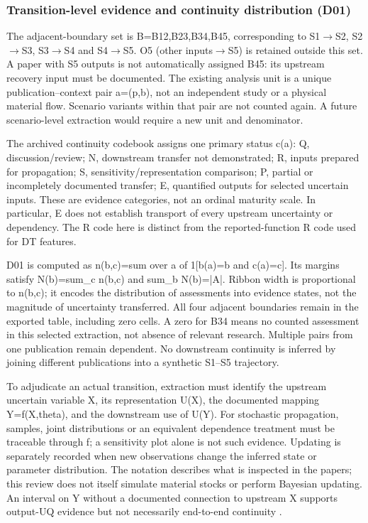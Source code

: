 \subsubsection{Transition-level evidence and continuity distribution (D01)}

The adjacent-boundary set is B={B12,B23,B34,B45}, corresponding to S1$\rightarrow$S2, S2$\rightarrow$S3, S3$\rightarrow$S4 and S4$\rightarrow$S5. O5 (other inputs$\rightarrow$S5) is retained outside this set. A paper with S5 outputs is not automatically assigned B45: its upstream recovery input must be documented. The existing analysis unit is a unique publication--context pair a=(p,b), not an independent study or a physical material flow. Scenario variants within that pair are not counted again. A future scenario-level extraction would require a new unit and denominator.

The archived continuity codebook assigns one primary status c(a): Q, discussion/review; N, downstream transfer not demonstrated; R, inputs prepared for propagation; S, sensitivity/representation comparison; P, partial or incompletely documented transfer; E, quantified outputs for selected uncertain inputs. These are evidence categories, not an ordinal maturity scale. In particular, E does not establish transport of every upstream uncertainty or dependency. The R code here is distinct from the reported-function R code used for DT features.

D01 is computed as n(b,c)=sum over a of 1[b(a)=b and c(a)=c]. Its margins satisfy N(b)=sum\_c n(b,c) and sum\_b N(b)=|A|. Ribbon width is proportional to n(b,c); it encodes the distribution of assessments into evidence states, not the magnitude of uncertainty transferred. All four adjacent boundaries remain in the exported table, including zero cells. A zero for B34 means no counted assessment in this selected extraction, not absence of relevant research. Multiple pairs from one publication remain dependent. No downstream continuity is inferred by joining different publications into a synthetic S1--S5 trajectory.

To adjudicate an actual transition, extraction must identify the upstream uncertain variable X, its representation U(X), the documented mapping Y=f(X,theta), and the downstream use of U(Y). For stochastic propagation, samples, joint distributions or an equivalent dependence treatment must be traceable through f; a sensitivity plot alone is not such evidence. Updating is separately recorded when new observations change the inferred state or parameter distribution. The notation describes what is inspected in the papers; this review does not itself simulate material stocks or perform Bayesian updating. An interval on Y without a documented connection to upstream X supports output-UQ evidence but not necessarily end-to-end continuity \citep{I25,I33}.

